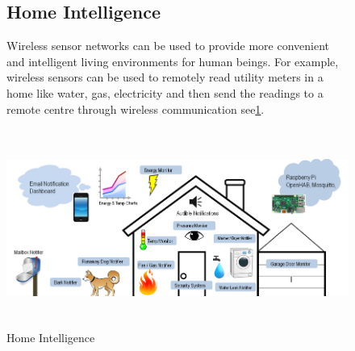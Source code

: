   \begin{figure}	
	\subsection{Home Intelligence}
			 Wireless sensor networks can be used to provide more convenient and intelligent living environments for human beings. For example, wireless sensors can be used to remotely read utility  meters in a home like water, gas, electricity and then  send  the  readings  to  a  remote  centre 
		through  wireless communication\cite{application} see\ref{fig:x Home_Intelligence}.
	
		\hfill
		\includegraphics[scale=0.5,width=12cm,height=6.5cm]{photos/home.png}
		\caption{Home Intelligence}
		\label{fig:x Home_Intelligence}
			\centering
		\hspace*{\fill}
  \end{figure}
		  
    	
    
